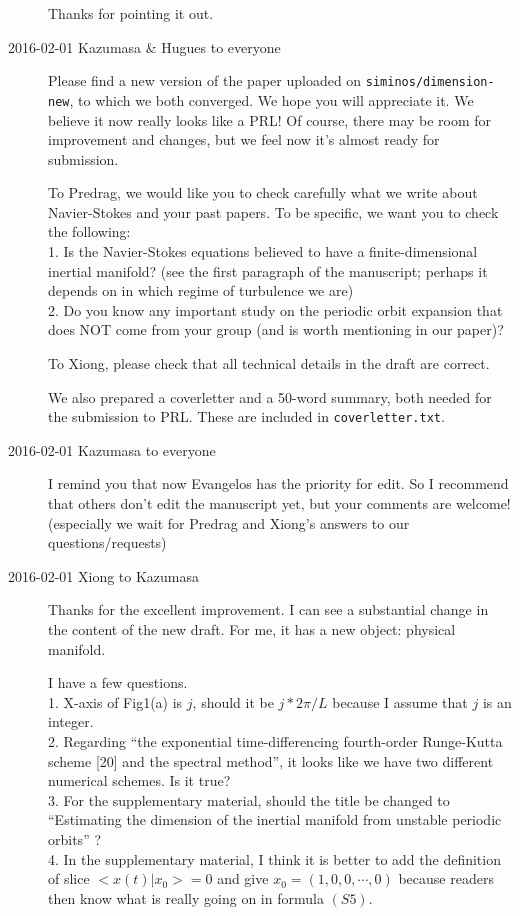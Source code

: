 \begin{description}
Thanks for pointing it out.

\item[2016-02-01 Kazumasa \& Hugues to everyone]

Please find a new version of the paper uploaded on \verb|siminos/dimension-new|, to which we both converged. We hope you will appreciate it. We believe it now really looks like a PRL! Of course, there may be room for improvement and changes, but we feel now it's almost ready for submission.

To Predrag, we would like you to check carefully what we write about Navier-Stokes and your past papers. To be specific, we want you to check the following:\\
1. Is the Navier-Stokes equations believed to have a finite-dimensional inertial manifold? (see the first paragraph of the manuscript; perhaps it depends on in which regime of turbulence we are)\\
2. Do you know any important study on the periodic orbit expansion that does NOT come from your group (and is worth mentioning in our paper)?

To Xiong, please check that all technical details in the draft are correct.

We also prepared a coverletter and a 50-word summary, both needed for the submission to PRL. These are included in \verb|coverletter.txt|.

\item[2016-02-01 Kazumasa to everyone]

I remind you that now Evangelos has the priority for edit.
So I recommend that others don't edit the manuscript yet, but your comments
 are welcome! (especially we wait for Predrag and Xiong's answers
 to our questions/requests)

\item[2016-02-01 Xiong to Kazumasa]
Thanks for the excellent improvement. I can see a substantial change in
the content of the new draft. For me, it has a new object:
physical manifold.

I have a few questions. \\
1. X-axis of Fig1(a) is $j$, should it be $j * 2\pi/L$ because I
assume that $j$ is an integer. \\
2. Regarding ``the exponential time-differencing fourth-order Runge-Kutta
scheme [20] and the spectral method'', it looks like we have two different
numerical schemes. Is it true? \\
3. For the supplementary material, should the title be changed to
``Estimating the dimension of the inertial manifold from
unstable periodic orbits'' ? \\
4. In the supplementary material, I think it is better to add the
definition of slice $<\hat{x}(t)|x_0> = 0$ and give
$x_0 = (1, 0, 0, \cdots, 0)$ because readers then know what is really
going on in formula $(S5)$.


\end{description}
